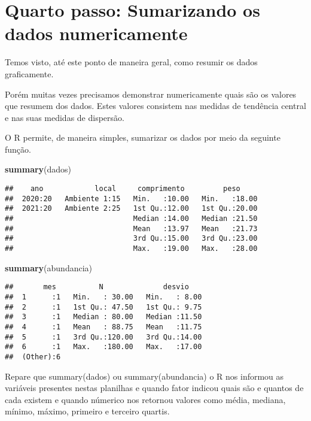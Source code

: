\documentclass[]{book}
\newenvironment{Shaded}{\begin{snugshade}}{\end{snugshade}}
\newcommand{\KeywordTok}[1]{\textcolor[rgb]{0.13,0.29,0.53}{\textbf{#1}}}
\newcommand{\NormalTok}[1]{#1}
\begin{document}
\hypertarget{quarto-passo-sumarizando-os-dados-numericamente}{%
\section{Quarto passo: Sumarizando os dados numericamente}\label{quarto-passo-sumarizando-os-dados-numericamente}}

Temos visto, até este ponto de maneira geral, como resumir os dados graficamente.

Porém muitas vezes precisamos demonstrar numericamente quais são os valores que resumem dos dados. Estes valores consistem nas medidas de tendência central e nas suas medidas de dispersão.

O R permite, de maneira simples, sumarizar os dados por meio da seguinte função.

\begin{Shaded}
\begin{Highlighting}[]
\KeywordTok{summary}\NormalTok{(dados)}
\end{Highlighting}
\end{Shaded}

\begin{verbatim}
##    ano            local     comprimento         peso      
##  2020:20   Ambiente 1:15   Min.   :10.00   Min.   :18.00  
##  2021:20   Ambiente 2:25   1st Qu.:12.00   1st Qu.:20.00  
##                            Median :14.00   Median :21.50  
##                            Mean   :13.97   Mean   :21.73  
##                            3rd Qu.:15.00   3rd Qu.:23.00  
##                            Max.   :19.00   Max.   :28.00
\end{verbatim}

\begin{Shaded}
\begin{Highlighting}[]
\KeywordTok{summary}\NormalTok{(abundancia)}
\end{Highlighting}
\end{Shaded}

\begin{verbatim}
##       mes          N              desvio     
##  1      :1   Min.   : 30.00   Min.   : 8.00  
##  2      :1   1st Qu.: 47.50   1st Qu.: 9.75  
##  3      :1   Median : 80.00   Median :11.50  
##  4      :1   Mean   : 88.75   Mean   :11.75  
##  5      :1   3rd Qu.:120.00   3rd Qu.:14.00  
##  6      :1   Max.   :180.00   Max.   :17.00  
##  (Other):6
\end{verbatim}

Repare que summary(dados) ou summary(abundancia) o R nos informou as variáveis presentes nestas planilhas e quando fator indicou quais são e quantos de cada existem e quando númerico nos retornou valores como média, mediana, mínimo, máximo, primeiro e terceiro quartis.
\end{document}
